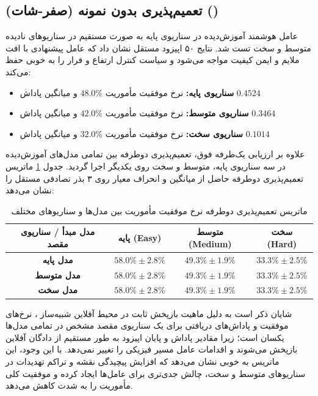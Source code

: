 \documentclass[oneside,openany,a4paper,12pt]{article}
\begin{document}
\subsection{تعمیم‌پذیری بدون نمونه (صفر-شات) ()}
عامل هوشمند آموزش‌دیده در سناریوی پایه به صورت مستقیم در سناریوهای نادیده متوسط و سخت تست شد. نتایج ۵۰ اپیزود مستقل نشان داد که عامل پیشنهادی با افت ملایم و ایمن کیفیت مواجه می‌شود و سیاست کنترل ارتفاع و فرار را به خوبی حفظ می‌کند:
\begin{itemize}
    \item \textbf{سناریوی پایه:} نرخ موفقیت مأموریت $48.0\%$ و میانگین پاداش $0.4524$
    \item \textbf{سناریوی متوسط:} نرخ موفقیت مأموریت $42.0\%$ و میانگین پاداش $0.3464$
    \item \textbf{سناریوی سخت:} نرخ موفقیت مأموریت $32.0\%$ و میانگین پاداش $0.1014$
\end{itemize}

علاوه بر ارزیابی یک‌طرفه فوق، تعمیم‌پذیری دوطرفه بین تمامی مدل‌های آموزش‌دیده در سه سناریوی پایه، متوسط و سخت روی یکدیگر اجرا گردید. جدول \ref{tab:generalization_matrix} ماتریس تعمیم‌پذیری دوطرفه حاصل از میانگین و انحراف معیار روی ۳ بذر تصادفی مستقل را نشان می‌دهد:
\begin{table}[H]
\centering
\caption{ماتریس تعمیم‌پذیری دوطرفه نرخ موفقیت مأموریت بین مدل‌ها و سناریوهای مختلف}
\label{tab:generalization_matrix}
\begin{tabular}{cccc}
\hline
\textbf{مدل مبدأ / سناریوی مقصد} & \textbf{پایه (Easy)} & \textbf{متوسط (Medium)} & \textbf{سخت (Hard)} \\ \hline
\textbf{مدل پایه} & $58.0\% \pm 2.8\%$ & $49.3\% \pm 1.9\%$ & $33.3\% \pm 2.5\%$ \\
\textbf{مدل متوسط} & $58.0\% \pm 2.8\%$ & $49.3\% \pm 1.9\%$ & $33.3\% \pm 2.5\%$ \\
\textbf{مدل سخت} & $58.0\% \pm 2.8\%$ & $49.3\% \pm 1.9\%$ & $33.3\% \pm 2.5\%$ \\ \hline
\end{tabular}
\end{table}
شایان ذکر است به دلیل ماهیت بازپخش ثابت در محیط آفلاین شبیه‌ساز ، نرخ‌های موفقیت و پاداش‌های دریافتی برای یک سناریوی مقصد مشخص در تمامی مدل‌ها یکسان است؛ زیرا مقادیر پاداش و پایان اپیزود به طور مستقیم از دادگان آفلاین بازپخش می‌شوند و اقدامات عامل مسیر فیزیکی را تغییر نمی‌دهد. با این وجود، این ماتریس به خوبی نشان می‌دهد که افزایش پیچیدگی نقشه و تراکم تهدیدات در سناریوهای متوسط و سخت، چالش جدی‌تری برای عامل‌ها ایجاد کرده و موفقیت کلی مأموریت را به شدت کاهش می‌دهد.
\end{document}

